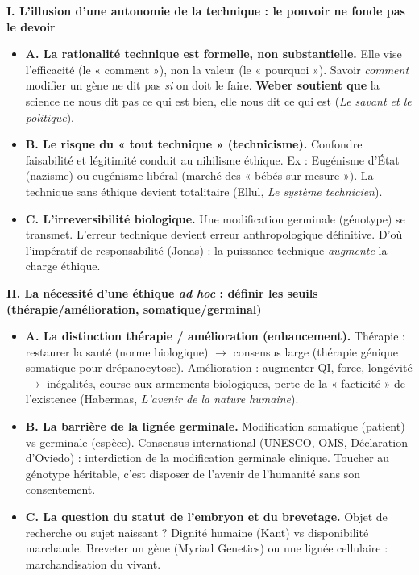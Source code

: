 \documentclass[11pt]{article}
\begin{document}
\begin{exoresolu}
    \textbf{I. L'illusion d'une autonomie de la technique : le pouvoir ne fonde pas le devoir}
    \begin{itemize}
        \item \textbf{A. La rationalité technique est formelle, non substantielle.} Elle vise l'efficacité (le « comment »), non la valeur (le « pourquoi »). Savoir \emph{comment} modifier un gène ne dit pas \emph{si} on doit le faire. \textbf{Weber soutient que} la science ne nous dit pas ce qui est bien, elle nous dit ce qui est (\emph{Le savant et le politique}).
        \item \textbf{B. Le risque du « tout technique » (technicisme).} Confondre faisabilité et légitimité conduit au nihilisme éthique. Ex : Eugénisme d'État (nazisme) ou eugénisme libéral (marché des « bébés sur mesure »). La technique sans éthique devient totalitaire (Ellul, \emph{Le système technicien}).
        \item \textbf{C. L'irreversibilité biologique.} Une modification germinale (génotype) se transmet. L'erreur technique devient erreur anthropologique définitive. D'où l'impératif de responsabilité (Jonas) : la puissance technique \emph{augmente} la charge éthique.
    \end{itemize}

    \textbf{II. La nécessité d'une éthique \emph{ad hoc} : définir les seuils (thérapie/amélioration, somatique/germinal)}
    \begin{itemize}
        \item \textbf{A. La distinction thérapie / amélioration (enhancement).} Thérapie : restaurer la santé (norme biologique) $\rightarrow$ consensus large (thérapie génique somatique pour drépanocytose). Amélioration : augmenter QI, force, longévité $\rightarrow$ inégalités, course aux armements biologiques, perte de la « facticité » de l'existence (Habermas, \emph{L'avenir de la nature humaine}).
        \item \textbf{B. La barrière de la lignée germinale.} Modification somatique (patient) vs germinale (espèce). Consensus international (UNESCO, OMS, Déclaration d'Oviedo) : interdiction de la modification germinale clinique. Toucher au génotype héritable, c'est disposer de l'avenir de l'humanité sans son consentement.
        \item \textbf{C. La question du statut de l'embryon et du brevetage.} Objet de recherche ou sujet naissant ? Dignité humaine (Kant) vs disponibilité marchande. Breveter un gène (Myriad Genetics) ou une lignée cellulaire : marchandisation du vivant.
    \end{itemize}


\end{exoresolu}
\end{document}
